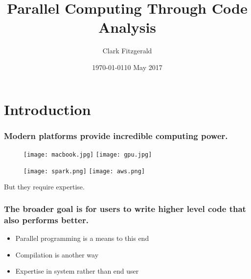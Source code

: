 \documentclass{beamer}
\begin{document}
\title{Parallel Computing Through Code Analysis}
\date{\today}
\date{10 May 2017}
\author{Clark Fitzgerald}

\frame{\titlepage}



\section{Introduction}
\begin{frame}

\frametitle{Modern platforms provide incredible computing power.}


\begin{figure}
            \texttt{[image: macbook.jpg]}
            \texttt{[image: gpu.jpg]}
\end{figure}
\begin{figure}
            \texttt{[image: spark.png]}
            \texttt{[image: aws.png]}
\end{figure}

\pause 

But they require expertise.

\end{frame}
\begin{frame}

    \frametitle{The broader goal is for users to write higher level code
    that also performs better.}


    \begin{itemize}
        \item Parallel programming is a means to this end
        \item Compilation is another way
        \item Expertise in system rather than end user
    \end{itemize}

\end{frame}
\end{document}

